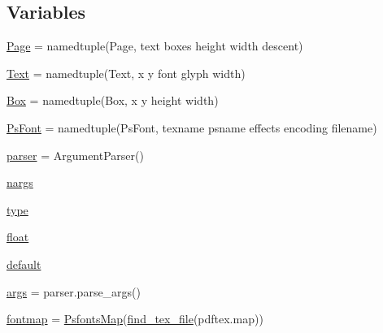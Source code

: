 \subsection*{Variables}
\begin{DoxyCompactItemize}
\item 
\hyperlink{namespacematplotlib_1_1dviread_ab6fc2a9d039280a2b95cca4ea9923e8f}{Page} = namedtuple(\textquotesingle{}Page\textquotesingle{}, \textquotesingle{}text boxes height width descent\textquotesingle{})
\item 
\hyperlink{namespacematplotlib_1_1dviread_ab3dd6a531da85833d83b56cd7e439533}{Text} = namedtuple(\textquotesingle{}Text\textquotesingle{}, \textquotesingle{}x y font glyph width\textquotesingle{})
\item 
\hyperlink{namespacematplotlib_1_1dviread_ad14c629f30e4deabf3a9e73a55d18bf0}{Box} = namedtuple(\textquotesingle{}Box\textquotesingle{}, \textquotesingle{}x y height width\textquotesingle{})
\item 
\hyperlink{namespacematplotlib_1_1dviread_a531c675b4fefac57dcdc95a215ba6b58}{Ps\+Font} = namedtuple(\textquotesingle{}Ps\+Font\textquotesingle{}, \textquotesingle{}texname psname effects encoding filename\textquotesingle{})
\item 
\hyperlink{namespacematplotlib_1_1dviread_a948647d17c88526e4b3f20b4376a638a}{parser} = Argument\+Parser()
\item 
\hyperlink{namespacematplotlib_1_1dviread_a967ac0b4497e2a5b03371a6ea7704516}{nargs}
\item 
\hyperlink{namespacematplotlib_1_1dviread_a68331d7aa39b2a07df46539ee5f772cb}{type}
\item 
\hyperlink{namespacematplotlib_1_1dviread_a9febeb276adf40be2abbc8d684399a87}{float}
\item 
\hyperlink{namespacematplotlib_1_1dviread_a57000936755bcae8e2c42b5fabd3a19a}{default}
\item 
\hyperlink{namespacematplotlib_1_1dviread_a5f306215cb3ae8dcdba5aeecf4263d90}{args} = parser.\+parse\+\_\+args()
\item 
\hyperlink{namespacematplotlib_1_1dviread_a76dcfe919cb900ecd6ab9b0d141c1d8c}{fontmap} = \hyperlink{classmatplotlib_1_1dviread_1_1PsfontsMap}{Psfonts\+Map}(\hyperlink{namespacematplotlib_1_1dviread_aded8f21bc8468b8fd589146ccf72ffce}{find\+\_\+tex\+\_\+file}(\textquotesingle{}pdftex.\+map\textquotesingle{}))
\end{DoxyCompactItemize}


